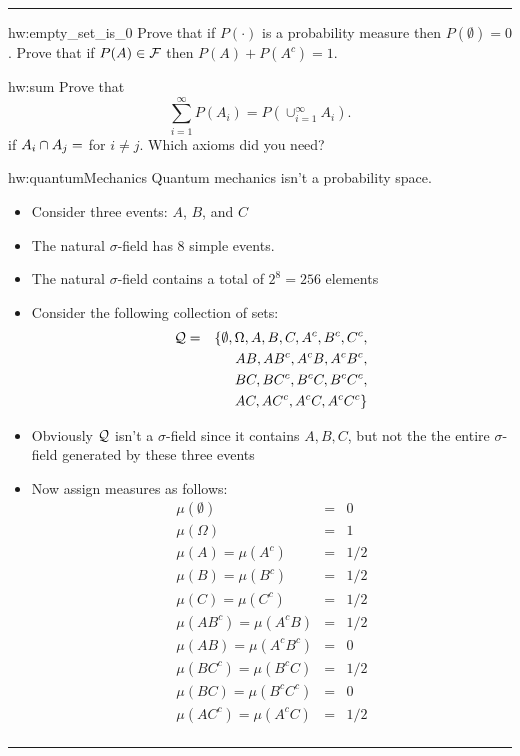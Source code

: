 \documentclass[14pt]{extarticle}
\newenvironment{textHW}{
  \noindent\rule{\textwidth}{1pt}%
  \begin{list}{}{
      \setlength{\labelwidth}{1cm}
      \setlength{\labelsep}{0.3cm}
      \setlength{\leftmargin}{1.3cm}
      \setlength{\rightmargin}{1cm}
      \setlength{\parsep}{0.5ex plus0.2ex minus0.1ex}
      \setlength{\topsep}{1pt plus3pt minus1pt}
      \setlength{\itemsep}{0ex plus0.2ex} 
      \renewcommand{\makelabel}[1]{\label{thw:##1}{\ref{##1}}}
      \sl}}%
  {\end{list}\rule{\textwidth}{1pt}}
\begin{document}
\begin{textHW}
\item[hw:empty_set_is_0] Prove that if $P(\cdot)$ is a probability
  measure then $P(\emptyset) = 0$.  Prove that if $P(A) \in {\cal
    F}$ then $P(A) + P(A^c) = 1$.
\item[hw:sum] Prove that 
\begin{displaymath}
\sum_{i=1}^{\infty}P(A_i) = P(\cup_{i=1}^{\infty} A_i).
\end{displaymath}
if $A_i \cap A_j = \empty$ for $i \ne j$.  Which axioms did you need?
\item[hw:quantumMechanics] Quantum mechanics isn't a probability space.
  \begin{itemize}
  \item Consider three events: $A$, $B$, and $C$
  \item The natural $\sigma$-field has 8 simple events.
  \item The natural $\sigma$-field contains a total of $2^8 = 256$
    elements 
  \item Consider the following collection of sets:
    \begin{eqnarray*}
      {\cal Q} &= &\{\emptyset,\Omega,A,B,C,A^c,B^c,C^c, \\
      & & AB,AB^c,A^cB,A^cB^c, \\
      & & BC,BC^c,B^cC,B^cC^c, \\
      & & AC,AC^c,A^cC,A^cC^c \}
    \end{eqnarray*}
  \item  Obviously ${\cal Q}$ isn't a $\sigma$-field since it
    contains $A,B,C$, but not the the entire $\sigma$-field generated
    by these three events
  \item Now assign measures as follows: 
    \begin{eqnarray*}
    \mu(\emptyset) &=& 0 \\
    \mu(\Omega) &=& 1 \\
    \mu(A)= \mu(A^c) &=& 1/2 \\
    \mu(B)= \mu(B^c) &=& 1/2 \\
    \mu(C)= \mu(C^c) &=& 1/2 \\
    \mu(AB^c) = \mu(A^cB) & =& 1/2 \\
    \mu(AB) = \mu(A^cB^c) &= &0 \\
    \mu(BC^c) = \mu(B^cC) &= &1/2 \\
    \mu(BC) = \mu(B^cC^c) &= & 0 \\
    \mu(AC^c) = \mu(A^cC) & = & 1/2 \\

\end{eqnarray*}
\end{itemize}
\end{textHW}
\end{document}
